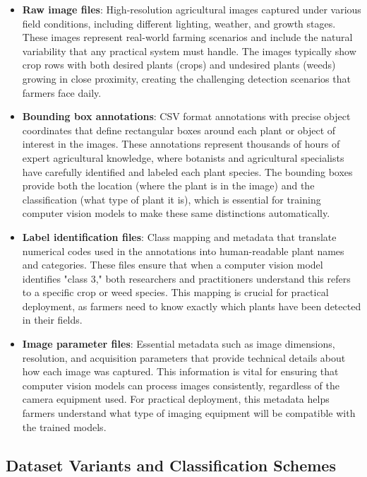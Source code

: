\begin{itemize}
    \item \textbf{Raw image files}: High-resolution agricultural images captured under various field conditions, including different lighting, weather, and growth stages. These images represent real-world farming scenarios and include the natural variability that any practical system must handle. The images typically show crop rows with both desired plants (crops) and undesired plants (weeds) growing in close proximity, creating the challenging detection scenarios that farmers face daily.
    
    \item \textbf{Bounding box annotations}: CSV format annotations with precise object coordinates that define rectangular boxes around each plant or object of interest in the images. These annotations represent thousands of hours of expert agricultural knowledge, where botanists and agricultural specialists have carefully identified and labeled each plant species. The bounding boxes provide both the location (where the plant is in the image) and the classification (what type of plant it is), which is essential for training computer vision models to make these same distinctions automatically.
    
    \item \textbf{Label identification files}: Class mapping and metadata that translate numerical codes used in the annotations into human-readable plant names and categories. These files ensure that when a computer vision model identifies "class 3," both researchers and practitioners understand this refers to a specific crop or weed species. This mapping is crucial for practical deployment, as farmers need to know exactly which plants have been detected in their fields.
    
    \item \textbf{Image parameter files}: Essential metadata such as image dimensions, resolution, and acquisition parameters that provide technical details about how each image was captured. This information is vital for ensuring that computer vision models can process images consistently, regardless of the camera equipment used. For practical deployment, this metadata helps farmers understand what type of imaging equipment will be compatible with the trained models.
\end{itemize}

\subsection{Dataset Variants and Classification Schemes}

